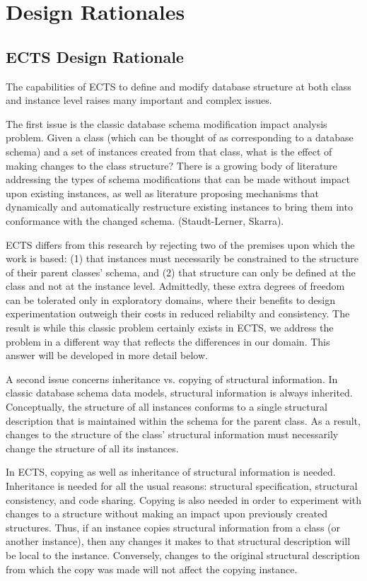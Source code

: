 \chapter{Design Rationales}
\section{ECTS Design Rationale}
\label{ects-dr}

The capabilities of ECTS to define and modify database structure at
both class and instance level raises many important and complex
issues.

The first issue is the classic database schema modification impact
analysis problem.  Given a class (which can be thought of as
corresponding to a database schema) and a set of instances created
from that class, what is the effect of making changes to the class
structure?  There is a growing body of literature addressing the types
of schema modifications that can be made without impact upon existing
instances, as well as literature proposing mechanisms that dynamically
and automatically restructure existing instances to bring them into
conformance with the changed schema. (Staudt-Lerner, Skarra).

ECTS differs from this research by rejecting two of the premises upon
which the work is based: (1) that instances must necessarily be
constrained to the structure of their parent classes' schema, and (2)
that structure can only be defined at the class and not at the
instance level.  Admittedly, these extra degrees of freedom can be
tolerated only in exploratory domains, where their benefits to design
experimentation outweigh their costs in reduced reliabilty and
consistency.  The result is while this classic problem certainly
exists in ECTS, we address the problem in a different way that
reflects the differences in our domain.  This answer will be developed
in more detail below.

A second issue concerns inheritance vs. copying of structural
information.  In classic database schema data models, structural
information is always inherited.  Conceptually, the structure of all
instances conforms to a single structural description that is
maintained within the schema for the parent class.  As a result,
changes to the structure of the class' structural information must
necessarily change the structure of all its instances.

In ECTS, copying as well as inheritance of structural information is
needed.  Inheritance is needed for all the usual reasons: structural
specification, structural consistency, and code sharing. Copying is
also needed in order to experiment with changes to a structure without
making an impact upon previously created structures. Thus, if an
instance copies structural information from a class (or another
instance), then any changes it makes to that structural description
will be local to the instance.  Conversely, changes to the original
structural description from which the copy was made will not affect
the copying instance.

